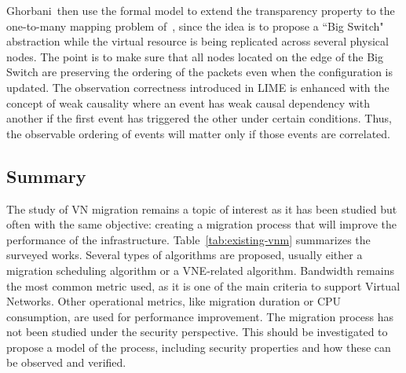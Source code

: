 Ghorbani~\etal then use the formal model to extend the transparency property to the one-to-many mapping problem of~\cite{toward-Ghorbani2014}, since the idea is to propose a ``Big Switch" abstraction while  the virtual resource is being replicated across several physical nodes. The point is to make sure that all nodes located on the edge of the Big Switch are preserving the ordering of the packets even when the configuration is updated.
The observation correctness introduced in LIME is enhanced with the concept of weak causality where an event has weak causal dependency with another if the first event has triggered the other under certain conditions.
Thus, the observable ordering of events will matter only if those events are correlated.


\subsection{Summary}
The study of VN migration remains a topic of interest as it has been studied but often with the same objective: creating a migration process that will improve the performance of the infrastructure. 
Table~\ref{tab:existing-vnm} summarizes the surveyed works. Several types of algorithms are proposed, usually either a migration scheduling algorithm or a VNE-related algorithm. 
Bandwidth remains the most common metric used, as it is one of the main criteria to support Virtual Networks. Other operational metrics, like migration duration or CPU consumption, are used for performance improvement.
The migration process has not been studied under the security perspective.
This should be investigated to propose a model of the process, including security properties and how these can be observed and verified. 

